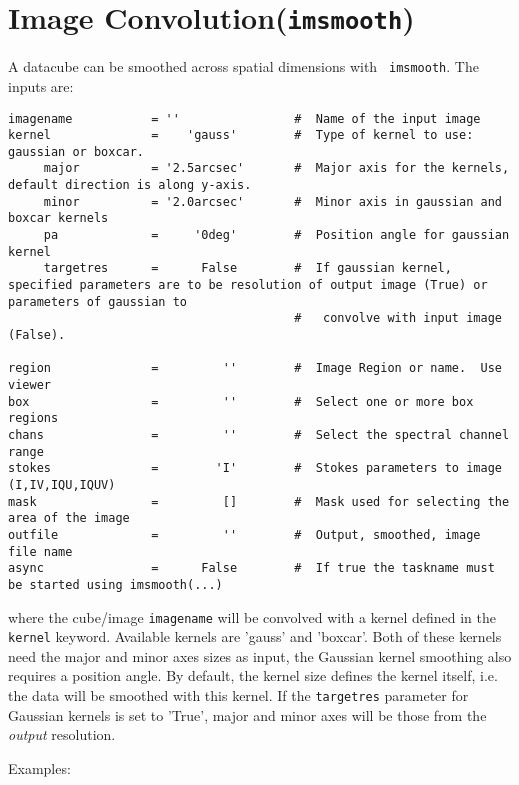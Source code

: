 \section{Image Convolution({\tt imsmooth})}
\label{section:analysis.imsmooth}

A datacube can be smoothed across spatial dimensions with {\tt
  imsmooth}. The inputs are:\\ 
\small
\begin{verbatim}
imagename           = ''                #  Name of the input image
kernel              =    'gauss'        #  Type of kernel to use: gaussian or boxcar.
     major          = '2.5arcsec'       #  Major axis for the kernels, default direction is along y-axis.
     minor          = '2.0arcsec'       #  Minor axis in gaussian and boxcar kernels
     pa             =     '0deg'        #  Position angle for gaussian kernel
     targetres      =      False        #  If gaussian kernel, specified parameters are to be resolution of output image (True) or parameters of gaussian to
                                        #   convolve with input image (False).

region              =         ''        #  Image Region or name.  Use viewer
box                 =         ''        #  Select one or more box regions
chans               =         ''        #  Select the spectral channel range
stokes              =        'I'        #  Stokes parameters to image (I,IV,IQU,IQUV)
mask                =         []        #  Mask used for selecting the area of the image
outfile             =         ''        #  Output, smoothed, image file name
async               =      False        #  If true the taskname must be started using imsmooth(...)
\end{verbatim}
\normalsize
where the cube/image {\tt imagename} will be convolved with a kernel
defined in the {\tt kernel} keyword. Available kernels are 'gauss' and
'boxcar'. Both of these kernels need the major and minor axes sizes as
input, the Gaussian kernel smoothing also requires a position
angle. By default, the kernel size defines the kernel itself, i.e. the
data will be smoothed with this kernel. If the {\tt targetres} parameter
for Gaussian kernels is set to 'True', major and minor axes will be
those from the {\it output} resolution. 

Examples: \\

